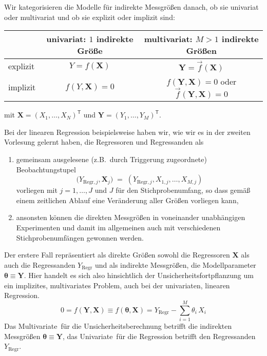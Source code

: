 Wir kategorisieren die Modelle für indirekte Messgrößen
danach, ob sie univariat oder multivariat und ob sie explizit oder implizit sind:

\begin{center}
{\setlength{\extrarowheight}{4pt}%
\begin{tabular}{l||c|c|}
\arraycolsep=4pt\def\arraystretch{2}
 & univariat: $1$ indirekte Größe & multivariat: $M>1$ indirekte Größen \\[4pt]
\hline\hline
explizit & $Y = f(\mathbf{X})$ & $\mathbf{Y} = \vec f(\mathbf{X})$\\[4pt]
\hline
implizit & $f(Y,\mathbf{X})=0$ & $f(\mathbf{Y},\mathbf{X})=0$ oder
 $\vec f(\mathbf{Y},\mathbf{X})=0$\\[4pt]
\hline
\end{tabular}}
\end{center}

mit $\mathbf{X} = (X_1,\dots,X_N)^\mathsf{T}$ und $\mathbf{Y} = (Y_1,\dots,Y_M)^\mathsf{T}$.

Bei der linearen Regression beispielsweise haben wir, wie wir es in der zweiten Vorlesung
gelernt haben, die Regressoren und Regressanden als
\begin{enumerate}
\item gemeinsam ausgelesene (z.B.\ durch Triggerung zugeordnete) Beobachtungstupel
\begin{equation}
\boldsymbol (Y_{\mathrm{Regr}, j}, \mathbf{X}_j) \; = \; (Y_{\mathrm{Regr}, j}, X_{1,j}, \dots, X_{M,j})
\end{equation}
vorliegen mit $j = 1,\dots, J$ und $J$ für den Stichprobenumfang, so dass gemäß einem
zeitlichen Ablauf eine Veränderung aller Größen vorliegen kann,
\item ansonsten können die direkten Messgrößen in voneinander unabhängigen Experimenten
und damit im allgemeinen auch mit verschiedenen Stichprobenumfängen gewonnen werden.
\end{enumerate}

Der erstere Fall repräsentiert als direkte Größen
sowohl die Regressoren $\mathbf{X}$ als auch die Regressanden $Y_{\mathrm{Regr}}$
und als indirekte Messgrößen, die Modellparameter $\boldsymbol \theta \equiv \boldsymbol Y$.
Hier handelt es sich also hinsichtlich der Unsicherheitsfortpflanzung um ein
implizites, multivariates Problem, auch bei der univariaten, linearen Regression.
\begin{equation}
0 = f(\mathbf{Y},\mathbf{X}) \equiv f(\boldsymbol \theta,\mathbf{X})
= Y_{\mathrm{Regr}} - \sum_{i=1}^{M} \theta_i \, X_i
\label{implizitMultivariatRegre}
\end{equation}
Das \glqq Multivariate\grqq ~für die Unsicherheitsberechnung betrifft die indirekten
Messgrößen $\boldsymbol \theta \equiv \boldsymbol Y$, das \glqq Univariate\grqq ~für die
Regression betrifft den Regressanden $Y_{\mathrm{Regr}}$.

